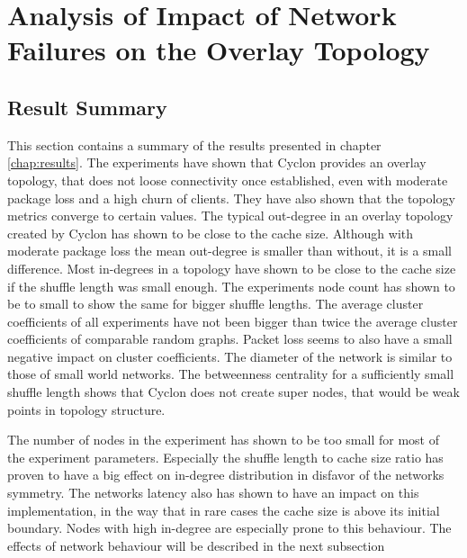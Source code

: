 \chapter{Analysis of Impact of Network Failures on the Overlay Topology} 
\label{chap:evaluation}

\FloatBarrier
\section{Result Summary}
	This section contains a summary of the results presented in chapter
	\ref{chap:results}. The experiments have shown that Cyclon provides an overlay
	topology, that does not loose connectivity once established, even with moderate
	package loss and a high churn of clients. They have also shown that the
	topology metrics converge to certain values. The typical out-degree in an
	overlay topology created by Cyclon has shown to be close to the cache size.
	Although with moderate package loss the mean out-degree is smaller than
	without, it is a small difference. Most in-degrees in a topology have shown to
	be close to the cache size if the shuffle length was small enough. The
	experiments node count has shown to be to small to show the same for bigger
	shuffle lengths. The average cluster coefficients of all experiments have not
	been bigger than twice the average cluster coefficients of comparable random
	graphs. Packet loss seems to also have a small negative impact on cluster
	coefficients. The diameter of the network is similar to those of small world
	networks. The betweenness centrality for a sufficiently small shuffle length
	shows that Cyclon does not create super nodes, that would be weak points in
	topology structure. 
	
	The number of nodes in the experiment has shown to be too small for most of the
	experiment parameters. Especially the shuffle length to cache size ratio has
	proven to have a big effect on in-degree distribution in disfavor of the
	networks symmetry. The networks latency also has shown to have an impact on
	this implementation, in the way that in rare cases the cache size is above its
	initial boundary. Nodes with high in-degree are especially prone to this
	behaviour. The effects of network behaviour will be described in the next
	subsection
	

